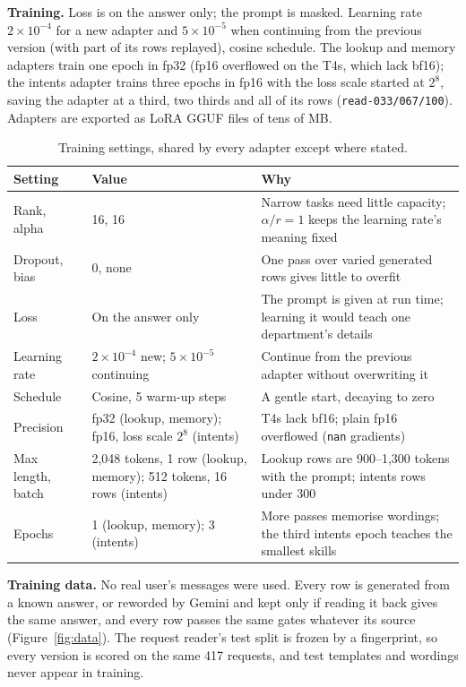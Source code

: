 \documentclass[11pt,a4paper]{article}
\begin{document}
\textbf{Training.} Loss is on the answer only; the prompt is masked. Learning rate $2\times10^{-4}$ for a new adapter
and $5\times10^{-5}$ when continuing from the previous version (with part of its rows replayed), cosine schedule.
The lookup and memory adapters train one epoch in fp32 (fp16 overflowed on the T4s, which lack bf16); the intents
adapter trains three epochs in fp16 with the loss scale started at $2^8$, saving the adapter at a third, two thirds
and all of its rows (\texttt{read-033/067/100}). Adapters are exported as LoRA GGUF files of tens of MB.

\begin{table}[H]
\centering\small
\begin{tabularx}{\textwidth}{@{}L{3.2cm} L{4.6cm} Y@{}}
\toprule
\textbf{Setting} & \textbf{Value} & \textbf{Why}\\
\midrule
Rank, alpha & 16, 16 & Narrow tasks need little capacity; $\alpha/r=1$ keeps the learning rate's meaning fixed\\
Dropout, bias & 0, none & One pass over varied generated rows gives little to overfit\\
Loss & On the answer only & The prompt is given at run time; learning it would teach one department's details\\
Learning rate & $2\times10^{-4}$ new; $5\times10^{-5}$ continuing & Continue from the previous adapter without overwriting it\\
Schedule & Cosine, 5 warm-up steps & A gentle start, decaying to zero\\
Precision & fp32 (lookup, memory); fp16, loss scale $2^8$ (intents) & T4s lack bf16; plain fp16 overflowed (\texttt{nan} gradients)\\
Max length, batch & 2,048 tokens, 1 row (lookup, memory); 512 tokens, 16 rows (intents) & Lookup rows are 900--1,300 tokens with the prompt; intents rows under 300\\
Epochs & 1 (lookup, memory); 3 (intents) & More passes memorise wordings; the third intents epoch teaches the smallest skills\\
\bottomrule
\end{tabularx}
\caption{Training settings, shared by every adapter except where stated.}
\label{tab:hparams}
\end{table}

\textbf{Training data.} No real user's messages were used. Every row is generated from a known answer, or reworded
by Gemini and kept only if reading it back gives the same answer, and every row passes the same gates whatever its
source (Figure~\ref{fig:data}). The request reader's test split is frozen by a fingerprint, so every version is
scored on the same 417 requests, and test templates and wordings never appear in training.
\end{document}
